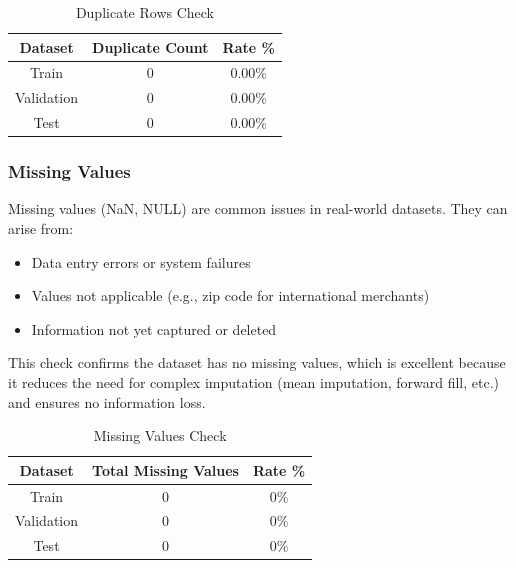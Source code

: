 \begin{table}[h]
\centering
\caption{Duplicate Rows Check}
\begin{tabular}{|c|c|c|}
\hline
\textbf{Dataset} & \textbf{Duplicate Count} & \textbf{Rate \%} \\
\hline
Train & 0 & 0.00\% \\
\hline
Validation & 0 & 0.00\% \\
\hline
Test & 0 & 0.00\% \\
\hline
\end{tabular}
\end{table}

\subsubsection{Missing Values}
Missing values (NaN, NULL) are common issues in real-world datasets. They can arise from:
\begin{itemize}
    \item Data entry errors or system failures
    \item Values not applicable (e.g., zip code for international merchants)
    \item Information not yet captured or deleted
\end{itemize}
This check confirms the dataset has no missing values, which is excellent because it reduces the need for complex imputation (mean imputation, forward fill, etc.) and ensures no information loss.

\begin{table}[h]
\centering
\caption{Missing Values Check}
\begin{tabular}{|c|c|c|}
\hline
\textbf{Dataset} & \textbf{Total Missing Values} & \textbf{Rate \%} \\
\hline
Train & 0 & 0\% \\
\hline
Validation & 0 & 0\% \\
\hline
Test & 0 & 0\% \\
\hline
\end{tabular}
\end{table}


